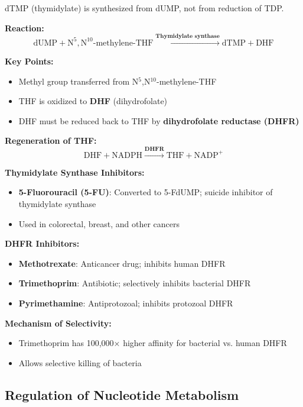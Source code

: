 dTMP (thymidylate) is synthesized from dUMP, not from reduction of TDP.

\textbf{Reaction:}
\[
\text{dUMP} + \text{N}^{5},\text{N}^{10}\text{-methylene-THF} \xrightarrow{\textbf{Thymidylate synthase}} \text{dTMP} + \text{DHF}
\]

\textbf{Key Points:}
\begin{itemize}
    \item Methyl group transferred from N$^5$,N$^{10}$-methylene-THF
    \item THF is oxidized to \textbf{DHF} (dihydrofolate)
    \item DHF must be reduced back to THF by \textbf{dihydrofolate reductase (DHFR)}
\end{itemize}

\textbf{Regeneration of THF:}
\[
\text{DHF} + \text{NADPH} \xrightarrow{\textbf{DHFR}} \text{THF} + \text{NADP}^+
\]

\begin{tcolorbox}[colback=red!5, colframe=red!70!black, title=\textbf{Clinical Correlation: Anticancer and Antimicrobial Drugs}]
\textbf{Thymidylate Synthase Inhibitors:}
\begin{itemize}
    \item \textbf{5-Fluorouracil (5-FU)}: Converted to 5-FdUMP; suicide inhibitor of thymidylate synthase
    \item Used in colorectal, breast, and other cancers
\end{itemize}

\textbf{DHFR Inhibitors:}
\begin{itemize}
    \item \textbf{Methotrexate}: Anticancer drug; inhibits human DHFR
    \item \textbf{Trimethoprim}: Antibiotic; selectively inhibits bacterial DHFR
    \item \textbf{Pyrimethamine}: Antiprotozoal; inhibits protozoal DHFR
\end{itemize}

\textbf{Mechanism of Selectivity:}
\begin{itemize}
    \item Trimethoprim has 100,000× higher affinity for bacterial vs. human DHFR
    \item Allows selective killing of bacteria
\end{itemize}
\end{tcolorbox}

\subsection{Regulation of Nucleotide Metabolism}

